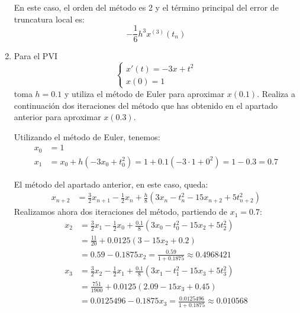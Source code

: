 \begin{ejercicio}
\begin{enumerate}
        En este caso, el orden del método es 2 y el término principal del error de truncatura local es:
        \begin{equation*}
            -\frac{1}{6}h^3x^{(3)}(t_n)
        \end{equation*}
        \item Para el PVI
            \begin{equation*}
                \begin{cases}
                    x'(t) = -3x + t^2 \\
                    x(0) = 1
                \end{cases}
            \end{equation*}
            toma $h = 0.1$ y utiliza el método de Euler para aproximar $x(0.1)$. Realiza a continuación dos iteraciones del método que has obtenido en el apartado anterior para aproximar $x(0.3)$.

            Utilizando el método de Euler, tenemos:
            \begin{align*}
                x_0 &= 1 \\
                x_1 &= x_0 + h(-3x_0 + t_0^2) = 1 + 0.1(-3\cdot 1 + 0^2) = 1 - 0.3 = 0.7
            \end{align*}

            El método del apartado anterior, en este caso, queda:
            \begin{align*}
                x_{n+2} &= \frac{3}{2} x_{n+1} - \frac{1}{2} x_n + \frac{h}{8}\left( 3x_n - t_n^2 -15 x_{n+2} + 5 t_{n+2}^2 \right)
            \end{align*}
            Realizamos ahora dos iteraciones del método, partiendo de $x_1=0.7$:
            \begin{align*}
                x_2 &= \frac{3}{2} x_1 - \frac{1}{2} x_0 + \frac{0.1}{8}\left( 3x_0 - t_0^2 -15 x_2 + 5 t_2^2 \right) \\
                &= \frac{11}{20} + 0.0125\left( 3 - 15x_2 + 0.2 \right) \\
                &= 0.59 - 0.1875 x_2 = \frac{0.59}{1 + 0.1875} \approx 0.4968421\\
                x_3 &= \frac{3}{2} x_2 - \frac{1}{2} x_1 + \frac{0.1}{8}\left( 3x_1 - t_1^2 -15 x_3 + 5 t_3^2 \right) \\
                &= \frac{751}{1900} + 0.0125\left( 2.09 - 15x_3 + 0.45 \right) \\
                &= 0.0125496 - 0.1875 x_3 = \frac{0.0125496}{1 + 0.1875} \approx 0.010568
            \end{align*}
    \end{enumerate}
\end{ejercicio}

